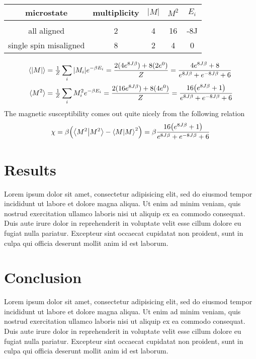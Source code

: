 \documentclass[a4paper, 12pt]{article}
\begin{document}
	\begin{center}
	\begin{tabular}{c c c c c}
		microstate	&	multiplicity	&	$|M|$	&	$M^2$ 	&	$E_i$\\
		\hline \\
		all aligned	&	2	&	4	&	16	&	-8J\\
		single spin misaligned & 8	&	2	&	4	&	0
	\end{tabular}
	\end{center}

	\begin{align*}
		\langle \abs{M} \rangle & = \tfrac{1}{Z} \sum_{i}\abs{M_i}e^{-\beta E_i} = \frac{2(4e^{8J\beta}) + 8(2e^{0})}{Z} = 
		\frac{4e^{8J\beta}+8}{e^{8J\beta}+e^{-8J\beta}+6}\\
		\langle M^2 \rangle & = \tfrac{1}{Z} \sum_{i}M_i^2e^{-\beta E_i} = \frac{2(16e^{8J\beta}) + 8(4e^{0})}{Z} = 
		\frac{16\qty(e^{8J\beta}+1)}{e^{8J\beta}+e^{-8J\beta}+6}\\
	\end{align*}
	The magnetic susceptibility comes out quite nicely from the following relation
	\begin{align*}
		\chi = \beta \qty( \braket{M^2} - \braket{M}^2 ) = \beta \frac{16\qty(e^{8J\beta}+1)}{e^{8J\beta}+e^{-8J\beta}+6}
	\end{align*}
	\newpage

\section{Results}
	Lorem ipsum dolor sit amet, consectetur adipisicing elit, sed do eiusmod
	tempor incididunt ut labore et dolore magna aliqua. Ut enim ad minim veniam,
	quis nostrud exercitation ullamco laboris nisi ut aliquip ex ea commodo
	consequat. Duis aute irure dolor in reprehenderit in voluptate velit esse
	cillum dolore eu fugiat nulla pariatur. Excepteur sint occaecat cupidatat non
	proident, sunt in culpa qui officia deserunt mollit anim id est laborum.

	\newpage

\section{Conclusion}
	Lorem ipsum dolor sit amet, consectetur adipisicing elit, sed do eiusmod
	tempor incididunt ut labore et dolore magna aliqua. Ut enim ad minim veniam,
	quis nostrud exercitation ullamco laboris nisi ut aliquip ex ea commodo
	consequat. Duis aute irure dolor in reprehenderit in voluptate velit esse
	cillum dolore eu fugiat nulla pariatur. Excepteur sint occaecat cupidatat non
	proident, sunt in culpa qui officia deserunt mollit anim id est laborum.
\end{document}
